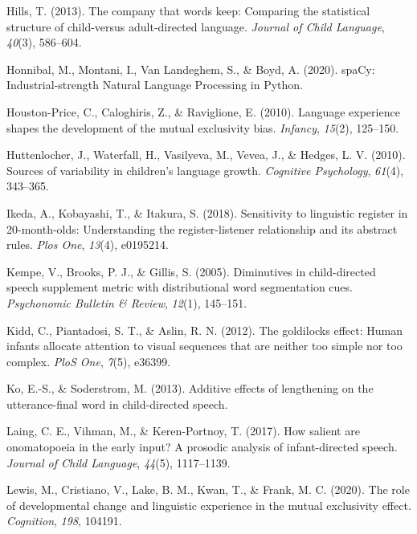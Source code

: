 \documentclass[10pt, letterpaper]{article}
\newenvironment{CSLReferences}%
  {}%
  {\par}
\begin{document}
\begin{CSLReferences}{1}{0}
\leavevmode\hypertarget{ref-hills2013company}{}%
Hills, T. (2013). The company that words keep: Comparing the statistical
structure of child-versus adult-directed language. \emph{Journal of
Child Language}, \emph{40}(3), 586--604.

\leavevmode\hypertarget{ref-honnibal2020spacy}{}%
Honnibal, M., Montani, I., Van Landeghem, S., \& Boyd, A. (2020).
{spaCy: Industrial-strength Natural Language Processing in Python}.

\leavevmode\hypertarget{ref-houston2010language}{}%
Houston-Price, C., Caloghiris, Z., \& Raviglione, E. (2010). Language
experience shapes the development of the mutual exclusivity bias.
\emph{Infancy}, \emph{15}(2), 125--150.

\leavevmode\hypertarget{ref-huttenlocher2010sources}{}%
Huttenlocher, J., Waterfall, H., Vasilyeva, M., Vevea, J., \& Hedges, L.
V. (2010). Sources of variability in children's language growth.
\emph{Cognitive Psychology}, \emph{61}(4), 343--365.

\leavevmode\hypertarget{ref-ikeda2018sensitivity}{}%
Ikeda, A., Kobayashi, T., \& Itakura, S. (2018). Sensitivity to
linguistic register in 20-month-olds: Understanding the
register-listener relationship and its abstract rules. \emph{Plos One},
\emph{13}(4), e0195214.

\leavevmode\hypertarget{ref-kempe2005diminutives}{}%
Kempe, V., Brooks, P. J., \& Gillis, S. (2005). Diminutives in
child-directed speech supplement metric with distributional word
segmentation cues. \emph{Psychonomic Bulletin \& Review}, \emph{12}(1),
145--151.

\leavevmode\hypertarget{ref-kidd2012goldilocks}{}%
Kidd, C., Piantadosi, S. T., \& Aslin, R. N. (2012). The goldilocks
effect: Human infants allocate attention to visual sequences that are
neither too simple nor too complex. \emph{PloS One}, \emph{7}(5),
e36399.

\leavevmode\hypertarget{ref-ko2013additive}{}%
Ko, E.-S., \& Soderstrom, M. (2013). Additive effects of lengthening on
the utterance-final word in child-directed speech.

\leavevmode\hypertarget{ref-laing2017salient}{}%
Laing, C. E., Vihman, M., \& Keren-Portnoy, T. (2017). How salient are
onomatopoeia in the early input? A prosodic analysis of infant-directed
speech. \emph{Journal of Child Language}, \emph{44}(5), 1117--1139.

\leavevmode\hypertarget{ref-lewis2020role}{}%
Lewis, M., Cristiano, V., Lake, B. M., Kwan, T., \& Frank, M. C. (2020).
The role of developmental change and linguistic experience in the mutual
exclusivity effect. \emph{Cognition}, \emph{198}, 104191.


\end{CSLReferences}
\end{document}
